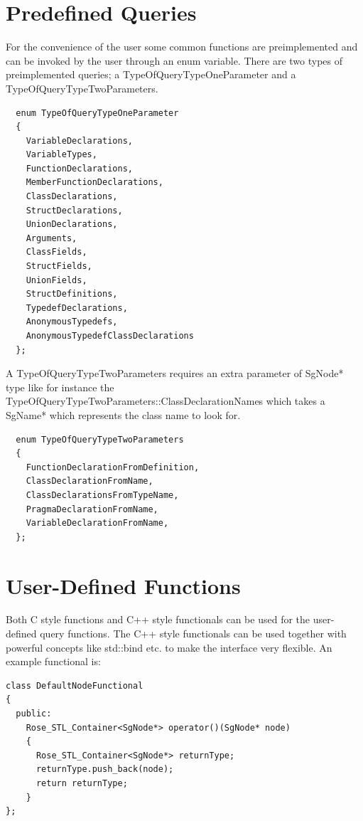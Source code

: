 \section{Predefined Queries}

For the convenience of the user some common functions are preimplemented and
can be invoked by the user through an enum variable. There are two types of
preimplemented queries; a TypeOfQueryTypeOneParameter and a
TypeOfQueryTypeTwoParameters. 

{\mySmallFontSize
\begin{verbatim}
  enum TypeOfQueryTypeOneParameter
  {
    VariableDeclarations,
    VariableTypes,
    FunctionDeclarations,
    MemberFunctionDeclarations,
    ClassDeclarations,
    StructDeclarations,
    UnionDeclarations,
    Arguments,
    ClassFields,
    StructFields,
    UnionFields,
    StructDefinitions,
    TypedefDeclarations,
    AnonymousTypedefs,
    AnonymousTypedefClassDeclarations
  };
\end{verbatim}
}

A TypeOfQueryTypeTwoParameters requires an
extra parameter of SgNode* type like for instance the
TypeOfQueryTypeTwoParameters::ClassDeclarationNames which takes a SgName*
which represents the class name to look for.

{\mySmallFontSize
\begin{verbatim}
  enum TypeOfQueryTypeTwoParameters
  {
    FunctionDeclarationFromDefinition,
    ClassDeclarationFromName,
    ClassDeclarationsFromTypeName,
    PragmaDeclarationFromName,
    VariableDeclarationFromName,
  };
\end{verbatim}
}





\section{User-Defined Functions}

Both C style functions and C++ style functionals can be used for the
user-defined query functions. The C++ style functionals can be used together
with powerful concepts like std::bind etc. to make the interface very 
flexible. An example functional is:

{\mySmallFontSize
\begin{verbatim}
class DefaultNodeFunctional
{
  public:
    Rose_STL_Container<SgNode*> operator()(SgNode* node)
    {
      Rose_STL_Container<SgNode*> returnType;
      returnType.push_back(node);
      return returnType;
    }
};
\end{verbatim}
}


